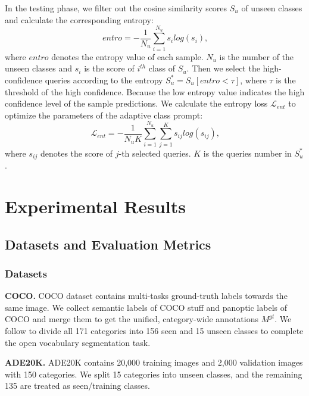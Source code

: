 \documentclass[10pt,twocolumn,letterpaper]{article}
\begin{document}
In the testing phase, we filter out the cosine similarity scores $S_u$ of unseen classes and calculate the corresponding entropy:
\begin{equation}
  entro = -\frac{1}{N_{u}} \sum^{N_{u}}_{i=1} s_i log(s_i) \text{,}
  \end{equation}
where $entro$ denotes the entropy value of each sample. $N_{u}$ is the number of the unseen classes and $s_i$ is the score of $i^{th}$ class of $S_u$. Then we select the high-confidence queries according to the entropy $S^*_u = S_u[entro < \tau]$, where $\tau$ is the threshold of the high confidence. Because the low entropy value indicates the high confidence level of the sample predictions. We calculate the entropy loss $\mathcal{L}_{ent}$ to optimize the parameters of the adaptive class prompt:
\begin{equation}
  \mathcal{L}_{ent}  = -\frac{1}{N_{u}K} \sum^{N_{u}}_{i=1} \sum^{K}_{j=1} s_{ij} log(s_{ij}) \text{,}
  \end{equation}
where $s_{ij}$ denotes the score of $j$-th  selected queries. $K$ is the queries number in $S^*_u$.


\section{Experimental Results}


\subsection{Datasets and Evaluation Metrics}

\subsubsection{Datasets}

\textbf{COCO.} COCO dataset \cite{lin2014microsoft} contains multi-tasks ground-truth labels towards the same image. We collect semantic labels of COCO stuff\cite{caesar2018coco} and panoptic labels of COCO and merge them to get the unified, category-wide annotations $M^{gt}$. 
We follow \cite{xian2019semantic, xu2021simple} to divide all 171 categories into 156 seen and 15 unseen classes to complete the open vocabulary segmentation task. 

\noindent \textbf{ADE20K.} ADE20K \cite{zhou2017scene} contains 20,000 training images and 2,000 validation images with 150 categories. We split 15 categories into unseen classes, and the remaining 135 are treated as seen/training classes.
\end{document}
